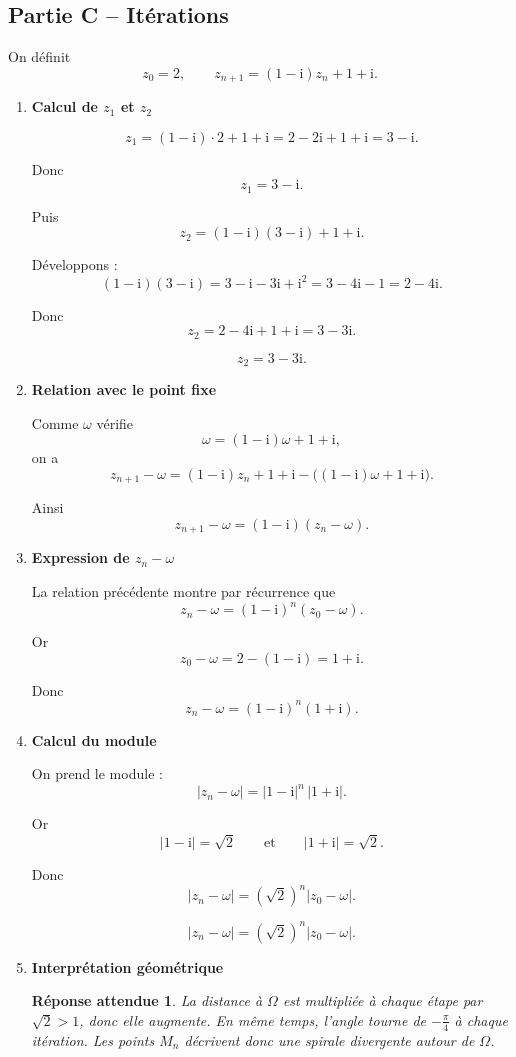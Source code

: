 \documentclass[11pt,a4paper]{article}
\newcommand{\ii}{\mathrm{i}}
\newtheorem*{reponseattendue}{Réponse attendue}
\begin{document}
\subsection*{Partie C -- Itérations}

On définit
\[
z_0=2,\qquad z_{n+1}=(1-\ii)z_n+1+\ii.
\]

\begin{enumerate}[label=\textbf{3.\arabic*}, resume, leftmargin=1.6em]

\item \textbf{Calcul de \(z_1\) et \(z_2\)}

\[
z_1=(1-\ii)\cdot 2+1+\ii=2-2\ii+1+\ii=3-\ii.
\]

Donc
\[
\boxed{z_1=3-\ii.}
\]

Puis
\[
z_2=(1-\ii)(3-\ii)+1+\ii.
\]

Développons :
\[
(1-\ii)(3-\ii)=3-\ii-3\ii+\ii^2=3-4\ii-1=2-4\ii.
\]

Donc
\[
z_2=2-4\ii+1+\ii=3-3\ii.
\]

\[
\boxed{z_2=3-3\ii.}
\]

\item \textbf{Relation avec le point fixe}

Comme \(\omega\) vérifie
\[
\omega=(1-\ii)\omega+1+\ii,
\]
on a
\[
z_{n+1}-\omega=(1-\ii)z_n+1+\ii-\big((1-\ii)\omega+1+\ii\big).
\]

Ainsi
\[
\boxed{z_{n+1}-\omega=(1-\ii)(z_n-\omega).}
\]

\item \textbf{Expression de \(z_n-\omega\)}

La relation précédente montre par récurrence que
\[
z_n-\omega=(1-\ii)^n(z_0-\omega).
\]

Or
\[
z_0-\omega=2-(1-\ii)=1+\ii.
\]

Donc
\[
\boxed{z_n-\omega=(1-\ii)^n(1+\ii).}
\]

\item \textbf{Calcul du module}

On prend le module :
\[
|z_n-\omega|=|1-\ii|^n\,|1+\ii|.
\]

Or
\[
|1-\ii|=\sqrt2
\qquad\text{et}\qquad
|1+\ii|=\sqrt2.
\]

Donc
\[
|z_n-\omega|=(\sqrt2)^n|z_0-\omega|.
\]

\[
\boxed{|z_n-\omega|=(\sqrt2)^n|z_0-\omega|.}
\]

\item \textbf{Interprétation géométrique}

\begin{reponseattendue}
La distance à \(\Omega\) est multipliée à chaque étape par \(\sqrt2>1\), donc elle augmente.  
En même temps, l’angle tourne de \(-\frac{\pi}{4}\) à chaque itération.  
Les points \(M_n\) décrivent donc une spirale divergente autour de \(\Omega\).
\end{reponseattendue}

\end{enumerate}
\end{document}
